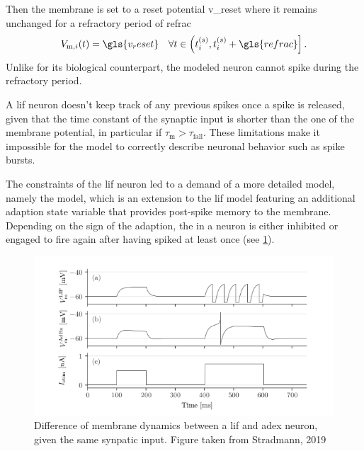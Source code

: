 Then the membrane is set to a reset potential \gls{v_reset} where it remains unchanged for a refractory period of \gls{refrac}
\begin{equation}
V_{\text{m}, i}(t) = \gls{v_reset} \quad \forall t \in \left(t_i^{(s)}, t_i^{(s)} + \gls{refrac}\right].
\end{equation}
Unlike for its biological counterpart, the modeled neuron cannot spike during the refractory period.

A \gls{lif} neuron doesn't keep track of any previous spikes once a spike is released, given that the time constant of the synaptic input is shorter than the one of the membrane potential, in particular if $\tau_\text{m} > \tau_\text{fall}$. These limitations make it impossible for the model to correctly describe neuronal behavior such as spike bursts.

The constraints of the \gls{lif} neuron led to a demand of a more detailed model, namely the  model, which is an extension to the \gls{lif} model featuring an additional adaption state variable that provides post-spike memory to the membrane. Depending on the sign of the adaption, the in a neuron is either inhibited or engaged to fire again after having spiked at least once (see \cref{lifvsadex}).


\begin{figure}
	\includegraphics[width=\linewidth]{figures/LIFvsAdEx.png}
	\caption{Difference of membrane dynamics between a \gls{lif} and \gls{adex} neuron, given the same synpatic input. Figure taken from Stradmann, 2019}
	\label{lifvsadex}
\end{figure}



